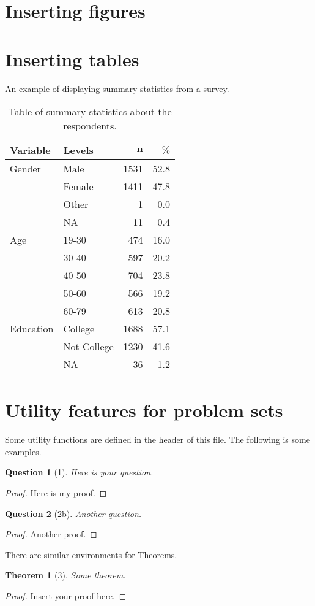 \documentclass[11pt]{article}
\theoremstyle{quest}
\newtheorem*{theorem}{Theorem}
\newtheorem*{question}{Question}
\begin{document}
\newpage
\section{Inserting figures}

\newpage 
\section{Inserting tables}

An example of displaying summary statistics from a survey.


\begin{table}[h!]
\centering
\begin{tabular}{ll|rr}
\hline
\hline
\textbf{Variable} & \textbf{Levels} & $\mathbf{n}$ & $\mathbf{\%}$ \\ 
\hline
Gender & Male & 1531 & 52.8 \\ 
   & Female & 1411 & 47.8 \\ 
   & Other & 1 & 0.0 \\ 
   & NA & 11 & 0.4\\
\hline
\hline
Age & 19-30 & 474 & 16.0 \\ 
   & 30-40 & 597 & 20.2 \\ 
   & 40-50 & 704 & 23.8 \\ 
   & 50-60 & 566 & 19.2 \\ 
   & 60-79 & 613 & 20.8 \\ 
\hline
\hline
Education & College & 1688 & 57.1 \\ 
   & Not College & 1230 & 41.6 \\ 
   & NA & 36 & 1.2 \\ 
\hline
\hline
\end{tabular}
\label{tab:sum}
\caption{Table of summary statistics about the respondents. 
  }
\end{table}


\newpage
\section{Utility features for problem sets}
Some utility functions are defined in the header of this file. 
The following is some examples.

\begin{question}[1]
Here is your question.
\end{question}
\begin{proof}
Here is my proof.
\end{proof}

\begin{question}[2b]
Another question.
\end{question}
\begin{proof}
Another proof.
\end{proof}

There are similar environments for Theorems.

\begin{theorem}[3]
  Some theorem.
\end{theorem}
\begin{proof}
  Insert your proof here.
\end{proof}

\end{document}
